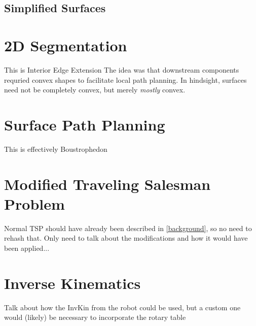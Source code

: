 \subsection{Simplified Surfaces}

\section{2D Segmentation}
This is Interior Edge Extension
The idea was that downstream components requried convex shapes to facilitate local path planning.
In hindsight, surfaces need not be completely convex, but merely \textit{mostly} convex.

\section{Surface Path Planning}
This is effectively Boustrophedon

\section{Modified Traveling Salesman Problem}
Normal TSP should have already been described in \ref{background}, so no need to rehash that.
Only need to talk about the modifications and how it would have been applied...

\section{Inverse Kinematics}
Talk about how the InvKin from the robot could be used, but a custom one would (likely) be necessary to incorporate the rotary table

